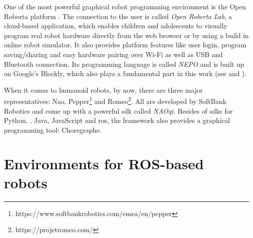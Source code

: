 One of the most powerful graphical robot programming environment is the Open Roberta platform \cite{OpenRoberta}. The connection to the user is called \textit{Open Roberta Lab}, a cloud-­based application, which enables children and adolescents to visually program real robot hardware directly from the web browser or by using a build in online robot simulator. It also provides platform features like user login, program saving/sharing and easy hardware pairing over Wi-Fi as well as USB and Bluetooth connection.\cite{Ketterl_Jost_Leimbach_Budde_2015} Its programming language is called \textit{NEPO} and is built up on Google's Blockly, which also plays a fundamental part in this work (see  and ).

When it comes to humanoid robots, by now, there are three major representatives: Nao\cite{Nao5152516}, Pepper\footnote{https://www.softbankrobotics.com/emea/en/pepper} and Romeo\footnote{https://projetromeo.com/}. All are developed by SoftBank Robotics and come up with a powerful \gls{sdk} called \textit{NAOqi}. Besides of \glspl{sdk} for Python, \Cpp{}, Java, JavaScript and \gls{ros}, the framework also provides a graphical programming tool: Choregraphe\cite{Choregraphe5326209}.

\section{Environments for ROS-based robots}




